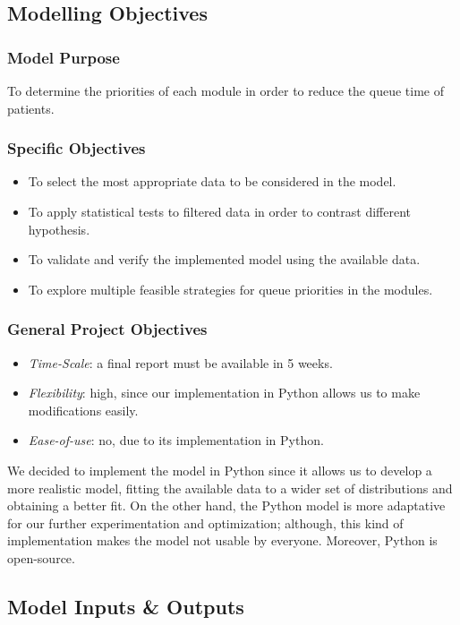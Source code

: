 \subsection{Modelling Objectives}
\subsubsection{Model Purpose}
To determine the priorities of each module in order to reduce the queue time of patients.
\subsubsection{Specific Objectives}
    \begin{itemize}
        \item To select the most appropriate data to be considered in the model.
        \item To apply statistical tests  to filtered data in order to contrast different hypothesis.
        \item To validate and verify the implemented model using the available data.
        \item To explore multiple feasible strategies for queue priorities in the modules.
    \end{itemize}

\subsubsection{General Project Objectives}
\begin{itemize}
    \item \textit{Time-Scale}: a final report must be available in 5 weeks.
    \item \textit{Flexibility}: high, since our implementation in Python allows us to make modifications easily.
    \item \textit{Ease-of-use}: no, due to its implementation in Python.
\end{itemize}

We decided to implement the model in Python since it allows us to develop a more realistic model, fitting the available data to a wider set of distributions and obtaining a better fit. On the other hand, the Python model is more adaptative for our further experimentation and optimization; although, this kind of implementation makes the model not usable by everyone. Moreover, Python is open-source.

\subsection{Model Inputs \& Outputs}

